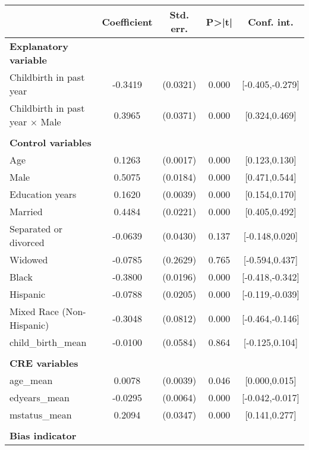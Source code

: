 {
\def\sym#1{\ifmmode^{#1}\else\(^{#1}\)\fi}
\begin{tabular}{l*{1}{cccc}}
\toprule
                    & Coefficient&   Std. err.&       P>|t|&  Conf. int.\\
\midrule
\textbf{Explanatory variable}&            &            &            &            \\
Childbirth in past year&     -0.3419&    (0.0321)&       0.000&[-0.405,-0.279]\\
Childbirth in past year $\times$ Male&      0.3965&    (0.0371)&       0.000&[0.324,0.469]\\
\\ \textbf{Control variables}&            &            &            &            \\
Age                 &      0.1263&    (0.0017)&       0.000&[0.123,0.130]\\
Male                &      0.5075&    (0.0184)&       0.000&[0.471,0.544]\\
Education years     &      0.1620&    (0.0039)&       0.000&[0.154,0.170]\\
Married             &      0.4484&    (0.0221)&       0.000&[0.405,0.492]\\
Separated or divorced&     -0.0639&    (0.0430)&       0.137&[-0.148,0.020]\\
Widowed             &     -0.0785&    (0.2629)&       0.765&[-0.594,0.437]\\
Black               &     -0.3800&    (0.0196)&       0.000&[-0.418,-0.342]\\
Hispanic            &     -0.0788&    (0.0205)&       0.000&[-0.119,-0.039]\\
Mixed Race (Non-Hispanic)&     -0.3048&    (0.0812)&       0.000&[-0.464,-0.146]\\
child\_birth\_mean    &     -0.0100&    (0.0584)&       0.864&[-0.125,0.104]\\
\\ \textbf{CRE variables}&            &            &            &            \\
age\_mean            &      0.0078&    (0.0039)&       0.046&[0.000,0.015]\\
edyears\_mean        &     -0.0295&    (0.0064)&       0.000&[-0.042,-0.017]\\
mstatus\_mean        &      0.2094&    (0.0347)&       0.000&[0.141,0.277]\\
\\ \textbf{Bias indicator}&            &            &            &            \\

\end{tabular}}
